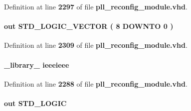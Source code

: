 Definition at line {\bf 2297} of file {\bf pll\+\_\+reconfig\+\_\+module.\+vhd}.

\paragraph[{data\+\_\+out}]{ {\bfseries \textcolor{keywordflow}{out}\textcolor{vhdlchar}{ }} {\bfseries \textcolor{comment}{S\+T\+D\+\_\+\+L\+O\+G\+I\+C\+\_\+\+V\+E\+C\+T\+OR}\textcolor{vhdlchar}{ }\textcolor{vhdlchar}{(}\textcolor{vhdlchar}{ }\textcolor{vhdlchar}{ } \textcolor{vhdldigit}{8} \textcolor{vhdlchar}{ }\textcolor{keywordflow}{D\+O\+W\+N\+TO}\textcolor{vhdlchar}{ }\textcolor{vhdlchar}{ } \textcolor{vhdldigit}{0} \textcolor{vhdlchar}{ }\textcolor{vhdlchar}{)}\textcolor{vhdlchar}{ }} \hspace{0.3cm}{\ttfamily [Port]}}\label{classpll__reconfig__module_a924035a325fa1dfcd6f71102ca9b22de}


Definition at line {\bf 2309} of file {\bf pll\+\_\+reconfig\+\_\+module.\+vhd}.

\paragraph[{ieee}]{\setlength{\rightskip}{0pt plus 5cm}\+\_\+library\+\_\+ ieeeieee}\label{classpll__reconfig__module_a0a6af6eef40212dbaf130d57ce711256}


Definition at line {\bf 2288} of file {\bf pll\+\_\+reconfig\+\_\+module.\+vhd}.

\paragraph[{pll\+\_\+areset}]{ {\bfseries \textcolor{keywordflow}{out}\textcolor{vhdlchar}{ }} {\bfseries \textcolor{comment}{S\+T\+D\+\_\+\+L\+O\+G\+IC}\textcolor{vhdlchar}{ }} \hspace{0.3cm}{\ttfamily [Port]}}\label{classpll__reconfig__module_a70abf2efbe0dac03c01035ec3a08efee}


